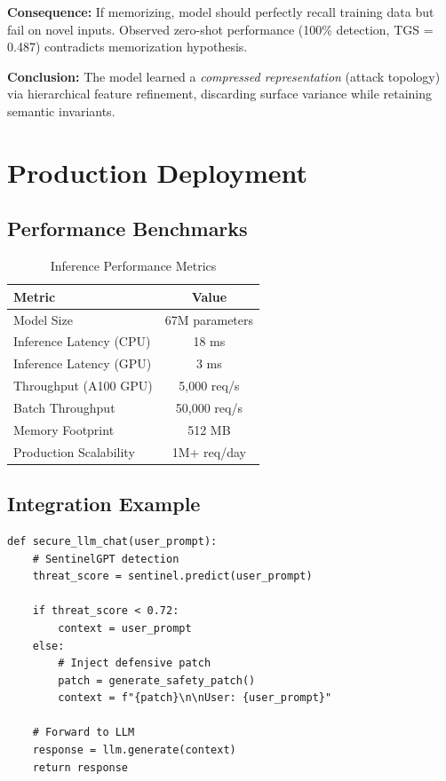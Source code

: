 \documentclass[11pt,twocolumn]{article}
\begin{document}
\textbf{Consequence:} If memorizing, model should perfectly recall training data but fail on novel inputs. Observed zero-shot performance (100\% detection, TGS = 0.487) contradicts memorization hypothesis.

\textbf{Conclusion:} The model learned a \textit{compressed representation} (attack topology) via hierarchical feature refinement, discarding surface variance while retaining semantic invariants.

\section{Production Deployment}

\subsection{Performance Benchmarks}

\begin{table}[h]
\centering
\caption{Inference Performance Metrics}
\begin{tabular}{@{}lc@{}}
\toprule
\textbf{Metric} & \textbf{Value} \\
\midrule
Model Size & 67M parameters \\
Inference Latency (CPU) & 18 ms \\
Inference Latency (GPU) & 3 ms \\
Throughput (A100 GPU) & 5,000 req/s \\
Batch Throughput & 50,000 req/s \\
Memory Footprint & 512 MB \\
Production Scalability & 1M+ req/day \\
\bottomrule
\end{tabular}
\end{table}

\subsection{Integration Example}

\begin{verbatim}
def secure_llm_chat(user_prompt):
    # SentinelGPT detection
    threat_score = sentinel.predict(user_prompt)
    
    if threat_score < 0.72:
        context = user_prompt
    else:
        # Inject defensive patch
        patch = generate_safety_patch()
        context = f"{patch}\n\nUser: {user_prompt}"
    
    # Forward to LLM
    response = llm.generate(context)
    return response
\end{verbatim}
\end{document}
